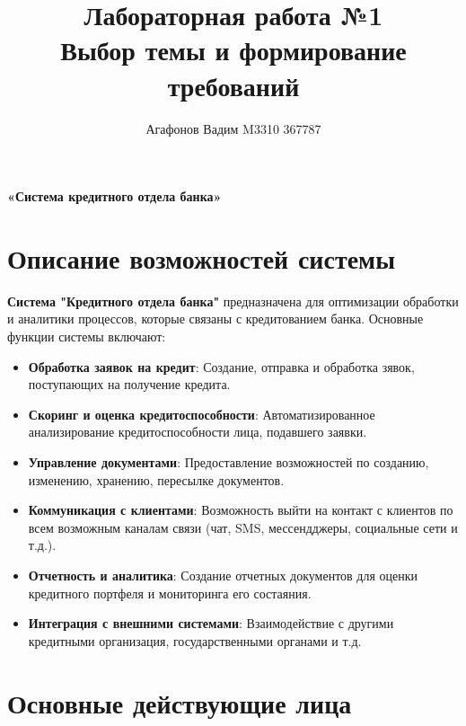 \documentclass[20pt]{article}
\begin{document}
\pagestyle{empty}
\normalsize

\title{Лабораторная работа №1 \\
Выбор темы и формирование требований}
\author{Агафонов Вадим M3310 367787}
\date{}
\maketitle

\centerline{\LARGE\textbf{«Система кредитного отдела банка»}}

\section{Описание возможностей системы}

\textbf{Система "Кредитного отдела банка"} предназначена для оптимизации обработки и аналитики процессов, которые связаны с кредитованием банка. Основные функции системы включают:



\begin{itemize}
    \item \textbf{Обработка заявок на кредит}: Создание, отправка и обработка зявок, поступающих на получение кредита.
    \item \textbf{Скоринг и оценка кредитоспособности}: Автоматизированное анализирование кредитоспособности лица, подавшего заявки.
    \item \textbf{Управление документами}: Предоставление возможностей по созданию, изменению, хранению, пересылке документов.
    \item \textbf{Коммуникация с клиентами}: Возможность выйти на контакт с клиентов по всем возможным каналам связи (чат, SMS, мессендджеры, социальные сети и т.д.).
    \item \textbf{Отчетность и аналитика}: Создание отчетных документов для оценки кредитного портфеля и мониторинга его состаяния.
    \item \textbf{Интеграция с внешними системами}: Взаимодействие с другими кредитными организация, государственными органами и т.д.
\end{itemize}

\section{Основные действующие лица}
\end{document}
